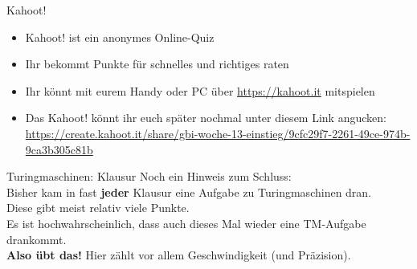 \framePrevEpisode

\begin{frame}{Kahoot!}
	\begin{itemize}[<+->]
		\item Kahoot! ist ein anonymes Online-Quiz
		\item Ihr bekommt Punkte für schnelles und richtiges raten
		\item Ihr könnt mit eurem Handy oder PC über \url{https://kahoot.it} mitspielen
		\item Das Kahoot! könnt ihr euch später nochmal unter diesem Link angucken: \\
			\url{https://create.kahoot.it/share/gbi-woche-13-einstieg/9cfc29f7-2261-49ce-974b-9ca3b305c81b}
	\end{itemize}
\end{frame}












\begin{frame}{Turingmaschinen: Klausur}
	Noch ein Hinweis zum Schluss:\\
	Bisher kam in {\tiny fast} \textbf{jeder} Klausur eine Aufgabe zu Turingmaschinen dran.\\
	Diese gibt meist relativ viele Punkte.\\
	
	\bigskip
	Es ist hochwahrscheinlich, dass auch dieses Mal wieder eine TM-Aufgabe drankommt.\\
	\textbf{Also übt das!} Hier zählt vor allem Geschwindigkeit (und Präzision).
\end{frame}

